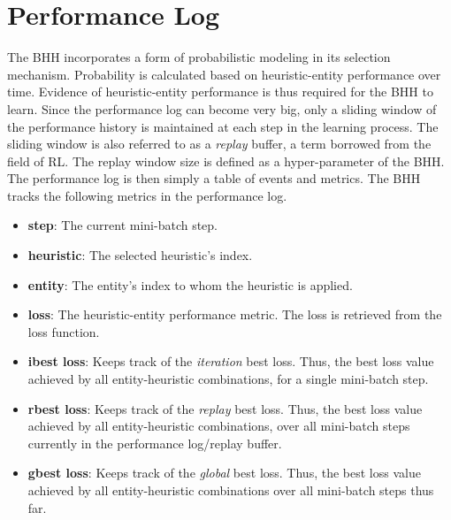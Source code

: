 \section{Performance Log}\label{sec:bhh:performance_log}

The \acs{BHH} incorporates a form of probabilistic modeling in its selection mechanism. Probability is calculated based on heuristic-entity performance over time. Evidence of heuristic-entity performance is thus required for the \acs{BHH} to learn. Since the performance log can become very big, only a sliding window of the performance history is maintained at each step in the learning process. The sliding window is also referred to as a \textit{replay} buffer, a term borrowed from the field of \acf{RL}. The replay window size is defined as a hyper-parameter of the \acs{BHH}. The performance log is then simply a table of events and metrics. The \acs{BHH} tracks the following metrics in the performance log.

\begin{itemize}
      \item \textbf{step}: The current mini-batch step.

      \item \textbf{heuristic}: The selected heuristic's index.

      \item \textbf{entity}: The entity's index to whom the heuristic is applied.

      \item \textbf{loss}: The heuristic-entity performance metric. The loss is retrieved from the loss function.

      \item \textbf{ibest loss}: Keeps track of the \textit{iteration} best loss. Thus, the best loss value achieved by all entity-heuristic combinations, for a single mini-batch step.

      \item \textbf{rbest loss}:  Keeps track of the \textit{replay} best loss. Thus, the best loss value achieved by all entity-heuristic combinations, over all mini-batch steps currently in the performance log/replay buffer.

      \item \textbf{gbest loss}:  Keeps track of the \textit{global} best loss. Thus, the best loss value achieved by all entity-heuristic combinations over all mini-batch steps thus far.
\end{itemize}

